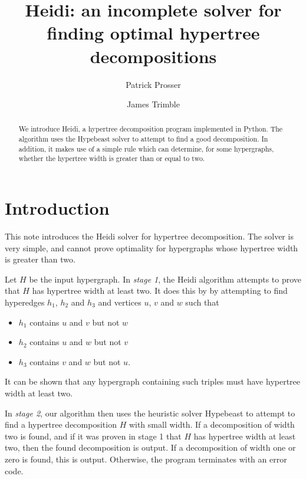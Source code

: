\documentclass[a4paper,UKenglish,cleveref, autoref]{lipics-v2019}
\title{Heidi: an incomplete solver for finding optimal hypertree decompositions}
\author{Patrick Prosser}{University of Glasgow, Scotland}{patrick.prosser@glasgow.ac.uk}{https://orcid.org/0000-0003-4460-6912}{}
\author{James Trimble}{University of Glasgow, Scotland}{j.trimble.1@research.gla.ac.uk}{https://orcid.org/0000-0001-7282-8745}{}
\begin{document}
\maketitle

\begin{abstract}
We introduce Heidi, a hypertree decomposition program implemented in Python.  The algorithm uses the Hypebeast solver to attempt to find a good decomposition.  In addition, it makes use of a simple rule which can determine, for some hypergraphs, whether the hypertree width is greater than or equal to two.
\end{abstract}

\section{Introduction}

This note introduces the Heidi solver for hypertree decomposition.  The solver is very simple, and cannot prove optimality for hypergraphs whose hypertree width is greater than two.

Let $H$ be the input hypergraph.  In \emph{stage 1}, the Heidi algorithm attempts to prove that $H$ has hypertree width at least two.  It does this by by attempting to find hyperedges $h_1$, $h_2$ and $h_3$ and vertices $u$, $v$ and $w$ such that
\begin{itemize}
  \item $h_1$ contains $u$ and $v$ but not $w$
  \item $h_2$ contains $u$ and $w$ but not $v$
  \item $h_3$ contains $v$ and $w$ but not $u$.
\end{itemize}

It can be shown that any hypergraph containing such triples must have hypertree width at least two.

In \emph{stage 2}, our algorithm then uses the heuristic solver Hypebeast to attempt to find a hypertree decomposition $H$ with small width.  If a decomposition of width two is found, and if it was proven in stage 1 that $H$ has hypertree width at least two, then the found decomposition is output.  If a decomposition of width one or zero is found, this is output.  Otherwise, the program terminates with an error code.
\end{document}
